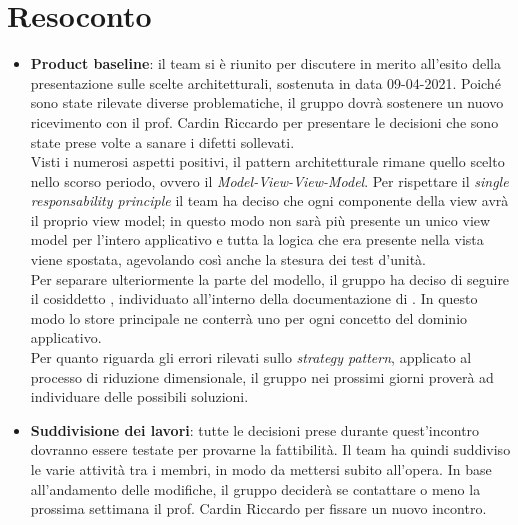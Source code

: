 \section{Resoconto}
\begin{itemize}
	\item \textbf{Product baseline}: il team si è riunito per discutere in merito all'esito della presentazione sulle scelte architetturali, sostenuta in data 09-04-2021. Poiché sono state rilevate diverse problematiche, il gruppo dovrà sostenere un nuovo ricevimento con il prof. Cardin Riccardo per presentare le decisioni che sono state prese volte a sanare i difetti sollevati. \mbox{} \\

Visti i numerosi aspetti positivi, il pattern architetturale rimane quello scelto nello scorso periodo, ovvero il \textit{Model-View-View-Model}. Per rispettare il \textit{single responsability principle}  il team ha deciso che ogni componente della view avrà il proprio view model; in questo modo non sarà più presente un unico view model per l'intero applicativo e tutta la logica che era presente nella vista viene spostata, agevolando così anche la stesura dei test d'unità. \\ Per separare ulteriormente la parte del modello, il gruppo ha deciso di seguire il cosiddetto , individuato all'interno della documentazione di . In questo modo lo store principale ne conterrà uno per ogni concetto del dominio applicativo. \mbox{} \\

Per quanto riguarda gli errori rilevati sullo \textit{strategy pattern}, applicato al processo di riduzione dimensionale, il gruppo nei prossimi giorni proverà ad individuare delle possibili soluzioni.

	\item \textbf{Suddivisione dei lavori}: tutte le decisioni prese durante quest'incontro dovranno essere testate per provarne la fattibilità. Il team ha quindi suddiviso le varie attività tra i membri, in modo da mettersi subito all'opera. In base all'andamento delle modifiche, il gruppo deciderà se contattare o meno la prossima settimana il prof. Cardin Riccardo per fissare un nuovo incontro.
\end{itemize}

\newpage